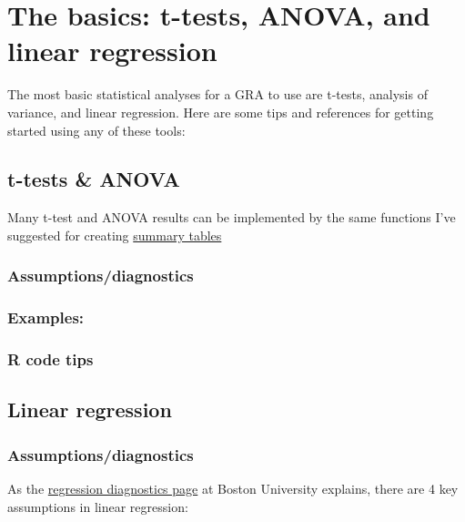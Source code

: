 \documentclass[
]{book}
\begin{document}
\hypertarget{the-basics-t-tests-anova-and-linear-regression}{%
\chapter{The basics: t-tests, ANOVA, and linear regression}\label{the-basics-t-tests-anova-and-linear-regression}}

The most basic statistical analyses for a GRA to use are t-tests, analysis of variance, and linear regression. Here are some tips and references for getting started using any of these tools:

\hypertarget{t-tests-anova}{%
\section{t-tests \& ANOVA}\label{t-tests-anova}}

Many t-test and ANOVA results can be implemented by the same functions I've suggested for creating \protect\hyperlink{tables}{summary tables}

\hypertarget{assumptionsdiagnostics}{%
\subsection{Assumptions/diagnostics}\label{assumptionsdiagnostics}}

\hypertarget{examples}{%
\subsection{Examples:}\label{examples}}

\hypertarget{r-code-tips}{%
\subsection{R code tips}\label{r-code-tips}}

\hypertarget{linear-regression}{%
\section{Linear regression}\label{linear-regression}}

\hypertarget{assumptionsdiagnostics-1}{%
\subsection{Assumptions/diagnostics}\label{assumptionsdiagnostics-1}}

As the \href{https://sphweb.bumc.bu.edu/otlt/MPH-Modules/BS/R/R5_Correlation-Regression/R5_Correlation-Regression7.html}{regression diagnostics page} at Boston University explains, there are 4 key assumptions in linear regression:
\end{document}
